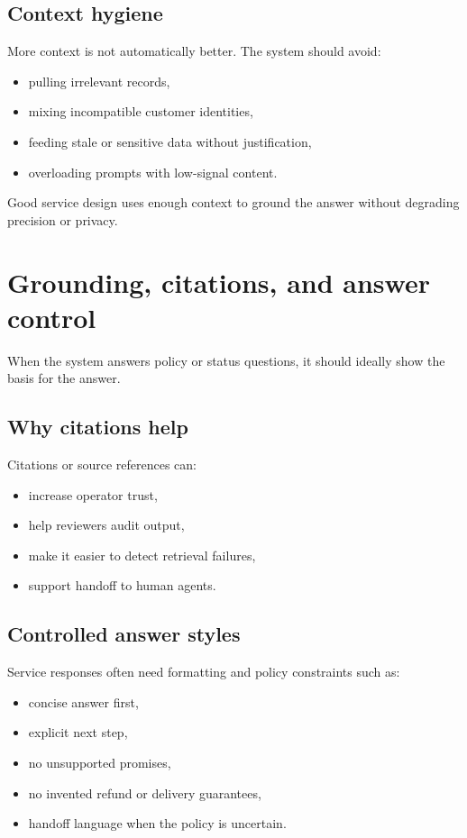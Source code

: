 \subsection{Context hygiene}
More context is not automatically better.
The system should avoid:
\begin{itemize}
  \item pulling irrelevant records,
  \item mixing incompatible customer identities,
  \item feeding stale or sensitive data without justification,
  \item overloading prompts with low-signal content.
\end{itemize}

Good service design uses enough context to ground the answer without degrading precision or privacy.

\section{Grounding, citations, and answer control}
When the system answers policy or status questions, it should ideally show the basis for the answer.

\subsection{Why citations help}
Citations or source references can:
\begin{itemize}
  \item increase operator trust,
  \item help reviewers audit output,
  \item make it easier to detect retrieval failures,
  \item support handoff to human agents.
\end{itemize}

\subsection{Controlled answer styles}
Service responses often need formatting and policy constraints such as:
\begin{itemize}
  \item concise answer first,
  \item explicit next step,
  \item no unsupported promises,
  \item no invented refund or delivery guarantees,
  \item handoff language when the policy is uncertain.
\end{itemize}

